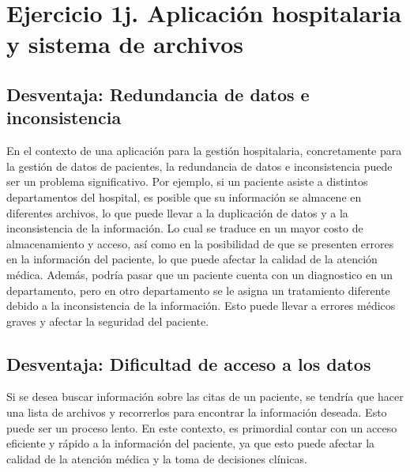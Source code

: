 
\section*{Ejercicio 1j. Aplicación hospitalaria y sistema de archivos}

\noident

\vspace{0.3cm}

\subsection*{\textcolor{unamblue}{Desventaja: Redundancia de datos e inconsistencia}}
En el contexto de una aplicación para la gestión hospitalaria, concretamente para la gestión de datos de pacientes, la redundancia de datos e inconsistencia puede ser un problema significativo. 
Por ejemplo, si un paciente asiste a distintos departamentos del hospital, es posible que su información se almacene en diferentes archivos, lo que puede llevar a la duplicación de datos y a la inconsistencia de la información.
Lo cual se traduce en un mayor costo de almacenamiento y acceso, así como en la posibilidad de que se presenten errores en la información del paciente, lo que puede afectar la calidad de la atención médica.
Además, podría pasar que un paciente cuenta con un diagnostico en un departamento, pero en otro departamento se le asigna un tratamiento diferente debido a la inconsistencia de la información. Esto puede llevar a errores médicos graves y afectar la seguridad del paciente.

\vspace{0.3cm}

\subsection*{\textcolor{unamblue}{Desventaja: Dificultad de acceso a los datos}}
Si se desea buscar información sobre las citas de un paciente, se tendría que hacer una lista de archivos y recorrerlos para encontrar la información deseada. Esto puede ser un proceso lento. 
En este contexto, es primordial contar con un acceso eficiente y rápido a la información del paciente, ya que esto puede afectar la calidad de la atención médica y la toma de decisiones clínicas.

